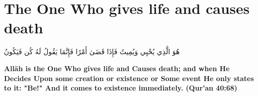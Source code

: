 \chapter{The One Who gives life and causes death}
\begin{center}
    {\Huge    
        \begin{Arabic}
            هُوَ الَّذِي يُحْيِي وَيُمِيتُ فَإِذَا قَضَىٰ أَمْرًا فَإِنَّمَا يَقُولُ لَهُ كُن فَيَكُونُ
        \end{Arabic}
    }
\end{center}
\vspace*{\fill}
\vspace{3cm}
\begin{center}
    \large \textbf{Allāh is the One Who gives life and Causes death; and when He Decides Upon some creation or existence or Some event He only states to it: "Be!" And it comes to existence immediately. (Qur'an 40:68)}
\end{center}
